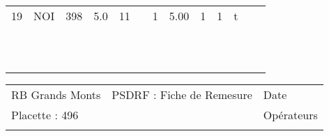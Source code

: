 \documentclass[a4paper, landscape]{article}\usepackage[]{graphicx}\usepackage[]{color}
\begin{document}
{\begin{tabular}{|p{1cm}|p{2cm}|p{1.6cm}|p{1.6cm}|p{1.6cm}|p{1.6cm}|p{1.5cm}|p{1.5cm}|p{1.5cm}|p{1.5cm}|p{1.5cm}|p{7.5cm}|p{5cm}|}
19 & NOI & 398 & 5.0 & 11 &  & 1 & 5.00 & 1 & 1 & t &  &  \\ 
   \rowcolor[gray]{0.95} \hline
 &  &  &  &  &  &  &  &  &  &  &  &  \\ 
   \hline
 &  &  &  &  &  &  &  &  &  &  &  &  \\ 
   \rowcolor[gray]{0.95} \hline
 &  &  &  &  &  &  &  &  &  &  &  &  \\ 
   \hline
 &  &  &  &  &  &  &  &  &  &  &  &  \\ 
   \rowcolor[gray]{0.95} \hline
 &  &  &  &  &  &  &  &  &  &  &  &  \\ 
   \hline
 &  &  &  &  &  &  &  &  &  &  &  &  \\ 
   \rowcolor[gray]{0.95} \hline
 &  &  &  &  &  &  &  &  &  &  &  &  \\ 
   \hline
 &  &  &  &  &  &  &  &  &  &  &  &  \\ 
   \rowcolor[gray]{0.95} \hline
 &  &  &  &  &  &  &  &  &  &  &  &  \\ 
   \hline
 &  &  &  &  &  &  &  &  &  &  &  &  \\ 
   \rowcolor[gray]{0.95} \hline
 &  &  &  &  &  &  &  &  &  &  &  &  \\ 
   \hline
\end{tabular}
}

\begin{tabular}{p{10cm}p{10cm}p{8cm}}
  RB Grands Monts & PSDRF : Fiche de Remesure & Date \\ 
  Placette : 496 &  & Opérateurs \\ 
   &  &  \\ 
  \end{tabular}
\end{document}

